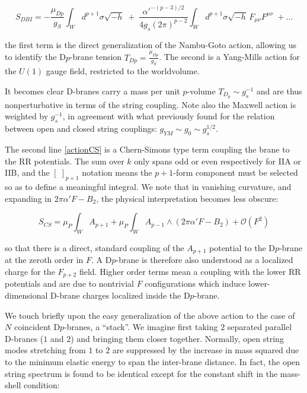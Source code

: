\begin{equation}
	S_{DBI} = -\frac{\mu_{Dp}}{g_S} \int_W d^{p+1} \sigma \sqrt{-h} \; + \; \frac{\alpha'^{-(p-3)/2}}{4 g_s (2\pi)^{p-2} } \int_W d^{p+1} \sigma \sqrt{-h} \, F_{\mu\nu} F^{\mu\nu} \;+  \dots
	\label{DBIexpanded}
\end{equation}

the first term is the direct generalization of the Nambu-Goto action, allowing us to identify the D$p$-brane tension $T_{Dp} = \frac{\mu_{Dp}}{g_S}$. The second is a Yang-Mills action for the $U(1)$ gauge field, restricted to the worldvolume.

It becomes clear D-branes carry a mass per unit $p$-volume $T_{D_p} \sim g_s^{-1}$ and are thus nonperturbative in terms of the string coupling. Note also the Maxwell action is weighted by $g_s^{-1}$, in agreement with what previously found for the relation between open and closed string couplings: $g_{YM} \sim g_0 \sim g_s^{1/2}$.

The second line \eqref{actionCS} is a Chern-Simons type term coupling the brane to the RR potentials. The sum over $k$ only spans odd or even respectively for IIA or IIB, and the $\left[ \; \right]_{p+1}$ notation means the $p+1$-form component must be selected so as to define a meaningful integral. We note that in vanishing curvature, and expanding in $2\pi\alpha'F-B_2$, the physical interpretation becomes less obscure:

\begin{equation}
	S_{CS} = \mu_P \int_W A_{p+1} + \mu_P \int_W A_{p-1} \wedge (2\pi\alpha'F - B_2) + \mathcal{O}(F^2)\label{} \end{equation}

so that there is a direct, standard coupling of the $A_{p+1}$ potential to the D$p$-brane at the zeroth order in $F$. A D$p$-brane is therefore also understood as a localized charge for the $F_{p+2}$ field. Higher order terms mean a coupling with the lower RR potentials and are due to nontrivial $F$ configurations which induce lower-dimensional D-brane charges localized inside the D$p$-brane.


\label{sec:branestacks}

We touch briefly upon the easy generalization of the above action to the case of $N$ coincident D$p$-branes, a ``stack''. We imagine first taking $2$ separated parallel D-branes ($1$ and $2$) and bringing them closer together. Normally, open string modes stretching from $1$ to $2$ are suppressed by the increase in mass squared due to the minimum elastic energy to span the inter-brane distance. In fact, the open string spectrum is found to be identical except for the constant shift in the mass-shell condition\cite{BBS}:


